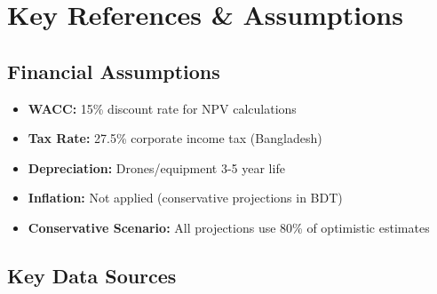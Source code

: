 \documentclass[12pt,a4paper,oneside]{book}
\begin{document}

















\backmatter

\appendix
\chapter{Key References \& Assumptions}

\section{Financial Assumptions}

\begin{itemize}
    \item \textbf{WACC:} 15\% discount rate for NPV calculations
    \item \textbf{Tax Rate:} 27.5\% corporate income tax (Bangladesh)
    \item \textbf{Depreciation:} Drones/equipment 3-5 year life
    \item \textbf{Inflation:} Not applied (conservative projections in BDT)
    \item \textbf{Conservative Scenario:} All projections use 80\% of optimistic estimates
\end{itemize}

\section{Key Data Sources}
\end{document}
